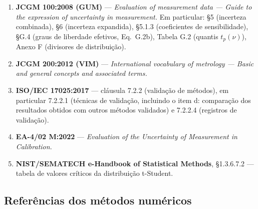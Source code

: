 \documentclass[11pt,a4paper]{article}
\begin{document}
\begin{enumerate}[label=R\arabic*., leftmargin=2.6em]
  \item \textbf{JCGM 100:2008 (GUM)} --- \emph{Evaluation of measurement data --- Guide to the expression of uncertainty in measurement.} Em particular: §5 (incerteza combinada), §6 (incerteza expandida), §5.1.3 (coeficientes de sensibilidade), §G.4 (graus de liberdade efetivos, Eq.~G.2b), Tabela G.2 (quantis \(t_p(\nu)\)), Anexo F (divisores de distribuição).
  \item \textbf{JCGM 200:2012 (VIM)} --- \emph{International vocabulary of metrology --- Basic and general concepts and associated terms.}
  \item \textbf{ISO/IEC 17025:2017} --- cláusula 7.2.2 (validação de métodos), em particular 7.2.2.1 (técnicas de validação, incluindo o item d: comparação dos resultados obtidos com outros métodos validados) e 7.2.2.4 (registros de validação).
  \item \textbf{EA-4/02 M:2022} --- \emph{Evaluation of the Uncertainty of Measurement in Calibration.}
  \item \textbf{NIST/SEMATECH e-Handbook of Statistical Methods}, §1.3.6.7.2 --- tabela de valores críticos da distribuição t-Student.
\end{enumerate}

\subsection{Referências dos métodos numéricos}
\end{document}
